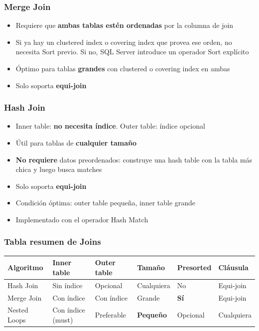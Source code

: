 \documentclass[11pt, a4paper]{article}
\begin{document}
\subsubsection{Merge Join}
\begin{itemize}
	\item Requiere que \textbf{ambas tablas estén ordenadas} por la columna de join
	\item Si ya hay un clustered index o covering index que provea ese orden, no necesita Sort previo. Si no, SQL Server introduce un operador Sort explícito
	\item Óptimo para tablas \textbf{grandes} con clustered o covering index en ambas
	\item Solo soporta \textbf{equi-join}
\end{itemize}

\subsubsection{Hash Join}
\begin{itemize}
	\item Inner table: \textbf{no necesita índice}. Outer table: índice opcional
	\item Útil para tablas de \textbf{cualquier tamaño}
	\item \textbf{No requiere} datos preordenados: construye una hash table con la tabla más chica y luego busca matches
	\item Solo soporta \textbf{equi-join}
	\item Condición óptima: outer table pequeña, inner table grande
	\item Implementado con el operador Hash Match
\end{itemize}

\subsubsection{Tabla resumen de Joins}

\begin{tabularx}{\textwidth}{@{}lXXllX@{}}
	\toprule
	\textbf{Algoritmo} & \textbf{Inner table} & \textbf{Outer table} & \textbf{Tamaño}  & \textbf{Presorted} & \textbf{Cláusula} \\
	\midrule
	Hash Join          & Sin índice           & Opcional             & Cualquiera       & No                 & Equi-join         \\
	Merge Join         & Con índice           & Con índice           & Grande           & \textbf{Sí}        & Equi-join         \\
	Nested Loops       & Con índice (must)    & Preferable           & \textbf{Pequeño} & Opcional           & Cualquiera        \\
	\bottomrule
\end{tabularx}
\end{document}
